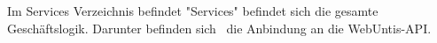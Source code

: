 
Im Services Verzeichnis befindet "Services" befindet sich die gesamte Geschäftslogik. Darunter befinden sich \zb\ die Anbindung an die WebUntis-API.